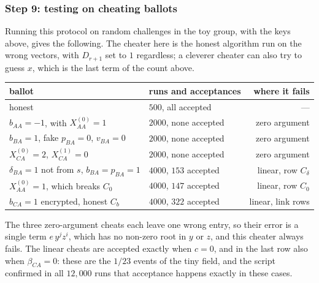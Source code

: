 \documentclass[11pt,a4paper]{article}
\theoremstyle{remark}
\begin{document}
\subsubsection*{Step 9: testing on cheating ballots}
Running this protocol on random challenges in the toy group, with the keys
above, gives the following. The cheater here is the honest algorithm run
on the wrong vectors, with $D_{r+1}$ set to $1$ regardless; a cleverer
cheater can also try to guess $x$, which is the last term of the count
above.
\begin{center}
\begin{tabularx}{\textwidth}{@{}>{\raggedright\arraybackslash}Xlr@{}}
\toprule
ballot & runs and acceptances & where it fails \\
\midrule
honest & $500$, all accepted & --- \\
$b_{AA} = -1$, with $X^{(0)}_{AA} = 1$ & $2000$, none accepted & zero argument \\
$b_{BA} = 1$, fake $p_{BA} = 0$, $v_{BA} = 0$ & $2000$, none accepted & zero argument \\
$X^{(0)}_{CA} = 2$, $X^{(1)}_{CA} = 0$ & $2000$, none accepted & zero argument \\
$\delta_{BA} = 1$ not from $s$, $b_{BA} = p_{BA} = 1$ & $4000$, $153$ accepted & linear, row $C_\delta$ \\
$X^{(0)}_{AA} = 1$, which breaks $C_0$ & $4000$, $147$ accepted & linear, row $C_0$ \\
$b_{CA} = 1$ encrypted, honest $C_b$ & $4000$, $322$ accepted & linear, link rows \\
\bottomrule
\end{tabularx}
\end{center}
The three zero-argument cheats each leave one wrong entry, so their error
is a single term $e\, y^{j} z^{i}$, which has no non-zero root in $y$ or
$z$, and this cheater always fails. The linear cheats are accepted exactly
when $c = 0$, and in the last row also when $\beta_{CA} = 0$: these are the
$1/23$ events of the tiny field, and the script confirmed in all $12{,}000$
runs that acceptance happens exactly in these cases.
\end{document}
